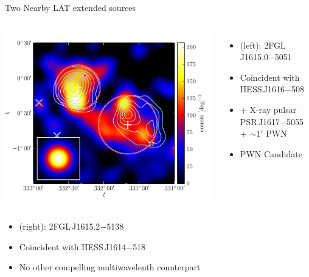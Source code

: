 \documentclass[12pt]{beamer}
\begin{document}
\begin{frame}{Two Nearby LAT extended sources}


  \begin{columns}
    \includegraphics[scale=0.5]{plots/source_HESS_J1614-518_color.pdf}
    \begin{itemize}
    \item (left): 
      2FGL\,J1615.0$-$5051
    \item Coincident with HESS\,J1616$-$508
    \item + X-ray pulsar
PSR\,J1617$-$5055 + $\sim 1'$ PWN 
    \item PWN Candidate
    \end{itemize}
  \end{columns}

  \begin{itemize}
    \item (right):
      2FGL\,J1615.2$-$5138 
    \item Coincident with HESS\,J1614$-$518
    \item No other compelling multiwavelenth counterpart
  \end{itemize}
\end{frame}
\end{document}
